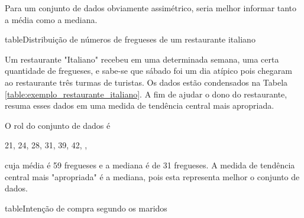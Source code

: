 \documentclass[11pt,fleqn]{book}
\numberwithin{mpicture}{chapter}
\numberwithin{mtable}{chapter}
\numberwithin{mframe}{chapter}
\begin{document}
\begin{remark}
	Para um conjunto de dados obviamente assimétrico, seria melhor informar tanto a média como a mediana.
\end{remark}

\begin{pageWidthArea}
	\begin{pageWidthAreaPicture}{table}{Distribuição de números de fregueses de um restaurante italiano}
		\label{table:exemplo_restaurante_italiano}
		\hspace{-15pt}
	\end{pageWidthAreaPicture}
\end{pageWidthArea}

\begin{example}
	Um restaurante "Italiano" recebeu em uma determinada semana, uma certa quantidade de fregueses, e sabe-se que sábado foi um dia atípico pois chegaram ao restaurante três turmas de turistas. Os dados estão condensados na Tabela \ref{table:exemplo_restaurante_italiano}. A fim de ajudar o dono do restaurante, resuma esses dados em uma medida de tendência central mais apropriada.
	
	O rol do conjunto de dados é
	\begin{center}
		21, 24, 28, 31, 39, 42, ,
	\end{center}
	cuja média é 59 fregueses e a mediana é de 31 fregueses. A medida de tendência central mais "apropriada" é a mediana, pois esta representa melhor o conjunto de dados.
\end{example}

\begin{pageWidthArea}
	\begin{pageWidthAreaPicture}{table}{Intenção de compra segundo os maridos}
		\label{table:exemplo_compras_marido}
	\end{pageWidthAreaPicture}
\end{pageWidthArea}
\end{document}
